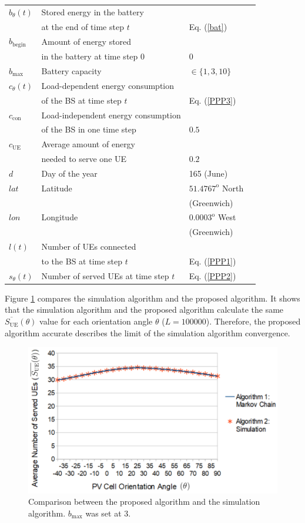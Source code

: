 \begin{longtable}{@{}l*{2}{|l}l@{}}
$b_\theta(t)$&Stored energy in the battery &\\
&at the end of time step $t$&Eq. (\ref{bat})\\
$b_{\mathrm{begin}}$&Amount of energy stored&\\
& in the battery at time step $0$&$0$ \\
$b_{\max}$  &Battery capacity& $\in\{1,3,10\}$\\
$c_\theta(t)$&Load-dependent energy consumption &\\
& of the BS at time step $t$&Eq. (\ref{PPP3})\\
$c_{\mathrm{con}}$ &Load-independent energy consumption& \\
 &of the BS in one time step & $0.5$\\
$c_{\mathrm{UE}}$ &Average amount of energy & \\
 & needed to serve one UE & $0.2$\\
$d$ &Day of the year &165 (June)\\
$lat$ &Latitude  &$51.4767^{\mathrm{o}}$ North \\
& & (Greenwich)\\
$lon$ &Longitude &$0.0003^{\mathrm{o}}$ West \\
& & (Greenwich)\\
$l(t)$&Number of UEs connected  &\\
&to the BS at time step $t$ &Eq. (\ref{PPP1})\\
$s_\theta(t)$&Number of served UEs at time step $t$&Eq. (\ref{PPP2})\\
\bottomrule
\end{longtable}







Figure \ref{result1} compares the simulation algorithm and the proposed algorithm. It shows that the simulation algorithm and the proposed algorithm calculate the same $\overline{S_{\mathrm{UE}}}(\theta)$ value for each orientation angle $\theta$ ($L=100000$). Therefore, the proposed algorithm accurate describes the limit of the simulation algorithm convergence. 

\begin{figure}[H]
	\centering
		\includegraphics[width=1\textwidth]{pictures/sim_vs_markov}
\caption{Comparison between the proposed algorithm and the simulation algorithm. $b_{\max}$ was set at 3. \label{result1}}
\end{figure}


